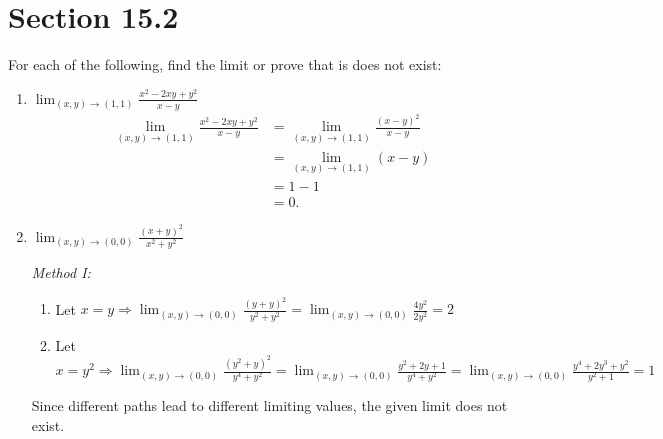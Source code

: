 \documentclass[letter,11pt]{article}
\begin{document}
\section*{Section 15.2}
 For each of the following, find the limit or prove that is does not exist:
\begin{enumerate}[label = \Alph*.]
    \item $\lim_{(x,y)\to (1,1)} \frac{x^2-2xy+y^2}{x-y}$
        \begin{align*}
            \lim_{(x,y)\to (1,1)} \frac{x^2-2xy+y^2}{x-y} &= \lim_{(x,y)\to (1,1)} \frac{(x - y)^2}{x - y} \\
            &= \lim_{(x,y)\to (1,1)} (x - y) \\
            &= 1 - 1 \\
            &= 0.
        \end{align*}
    \item $\lim_{(x,y)\to (0,0)} \frac{(x+y)^2}{x^2+y^2}$
    
    \vspace{0.5cm}
    \textit{Method I:}
        \begin{enumerate}
            \item Let $x=y \Longrightarrow \lim_{(x,y)\to (0,0)} \frac{(y+y)^2}{y^2+y^2} = \lim_{(x,y)\to (0,0)} \frac{4y^2}{2y^2} = 2$
            \item Let  $x=y^2 \Longrightarrow \lim_{(x,y)\to (0,0)} \frac{(y^2+y)^2}{y^4+y^2} = \lim_{(x,y)\to (0,0)} \frac{y^2+2y+1}{y^4+y^2}  = \lim_{(x,y)\to (0,0)} \frac{y^4+2y^3+y^2}{y^2+1} = 1$
        \end{enumerate}
        Since different paths lead to different limiting values, the given limit does not exist.
    

\end{enumerate}
\end{document}
